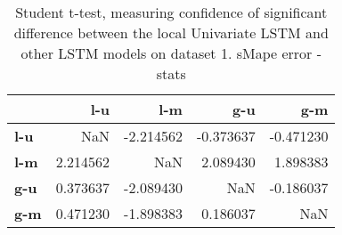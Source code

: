 \begin{table}[H]
\centering
\caption{Student t-test, measuring confidence of significant difference between the local Univariate LSTM and other LSTM models on dataset 1. sMape error - stats}
\label{table:ttest-stats-lstm-experiments-sMAPE-dataset-1}
\begin{tabular}{lrrrr}
\toprule
{} &       l-u &       l-m &       g-u &       g-m \\
\midrule
\textbf{l-u} &       NaN & -2.214562 & -0.373637 & -0.471230 \\
\textbf{l-m} &  2.214562 &       NaN &  2.089430 &  1.898383 \\
\textbf{g-u} &  0.373637 & -2.089430 &       NaN & -0.186037 \\
\textbf{g-m} &  0.471230 & -1.898383 &  0.186037 &       NaN \\
\bottomrule
\end{tabular}
\end{table}
